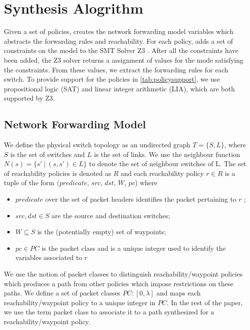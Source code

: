 \section{Synthesis Alogrithm}
Given a set of policies, \Name creates the network forwarding model variables which abstracts the forwarding rules and reachability. For each policy, \Name adds a set of constraints on the model to the SMT Solver Z3 \cite{z3}. After all the constraints have been added, the Z3 solver returns a assignment of values for the mode satisfying the constraints. From these values, we extract the forwarding rules for each switch.
To provide support for the policies in \cref{tab:policysupport}, we use propositional logic (SAT) and linear integer arithmetic (LIA),
which are both supported by Z3. 
\subsection{Network Forwarding Model} \label{sec:fwdmodel}
We define the physical switch topology as an undirected graph $T=\{S, L\}$, where $S$ is the set of switches and $L$ is the set of links. We use the neighbour function $N(s) = \{s'\ | \ (s,s') \in L \}$ to denote the set of neighbour switches of L. The set of reachability policies is denoted as $R$ and each reachability policy $r \in R$ is
a tuple of the form $(predicate$, $src$, $dst$, $W$, $pc$) where
\begin{itemize}
\item  $predicate$ over the set of packet headers identifies the packet pertaining to $r$ ;
\item  $src,dst \in S$ are the source and destination switches;
\item $W\subseteq S$ is the (potentially empty) set of waypoints;
\item $pc \in PC$ is the packet class and is a unique integer used to identify the variables associated to $r$
\end{itemize} 
We use the notion of packet classes to distinguish reachability/waypoint policies which produces a path from other policies which impose restrictions on these paths. We define a set of packet classes $PC : [0,\lambda]$ and maps each reachability/waypoint policy to a unique integer in $PC$. In the rest of the paper, we use the term packet class to associate it to a path synthesized for a reachability/waypoint policy. 
